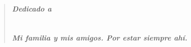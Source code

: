 \newpage
\thispagestyle{empty}

~

\cleardoublepage
{}
\thispagestyle{empty}

\vspace{6cm}

\begin{quotation}
\noindent \begin{center}
\textbf{\emph{\Large Dedicado a}}\textbf{\emph{\large }}\\
\textbf{\emph{\large }}\\
\textbf{\emph{\large }}\\
\textbf{\emph{\large Mi familia y mis amigos. Por estar siempre ahí.}}
\par\end{center}{\large \par}
\end{quotation}
\newpage
\thispagestyle{empty}

~\newpage
\thispagestyle{empty}


